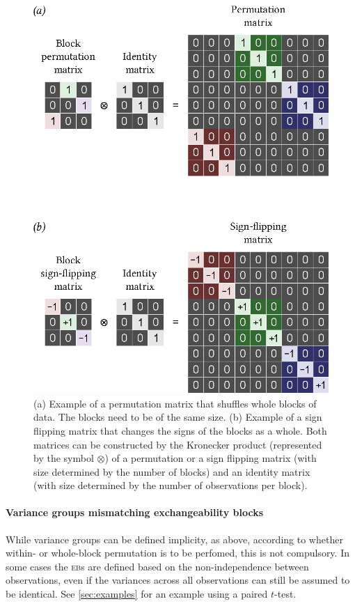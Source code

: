 \begin{figure}[!p]
\centering
\includegraphics{images/whole-block.eps}
\caption[Example of permutation and sign flipping matrix for whole-block exchangeability]{(a) Example of a permutation matrix that shuffles whole blocks of data. The blocks need to be of the same size. (b) Example of a sign flipping matrix that changes the signs of the blocks as a whole. Both matrices can be constructed by the Kronecker product (represented by the symbol $\otimes$) of a permutation or a sign flipping matrix (with size determined by the number of blocks) and an identity matrix (with size determined by the number of observations per block).}
\label{fig:whole-block}
\end{figure}

\paragraph{Variance groups mismatching exchangeability blocks} While variance groups can be defined implicity, as above, according to whether within- or whole-block permutation is to be perfomed, this is not compulsory. In some cases the \textsc{eb}s are defined based on the non-independence between observations, even if the variances across all observations can still be assumed to be identical. See \ref{sec:examples} for an example using a paired $t$-test.

